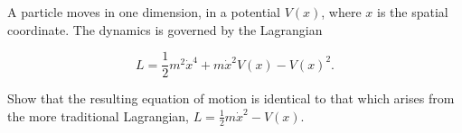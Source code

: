 \documentclass[../main.tex]{subfiles}
\begin{document}
\begin{problema}
	A particle moves in one dimension, in a potential \(V(x)\), where \(x\)
	is the spatial coordinate. The dynamics is governed by the Lagrangian

	\begin{equation*}
		L = \dfrac{1}{2}m^{2}\dot{x}^{4} + m \dot{x}^{2}V(x) - V(x)^{2}.
	\end{equation*}

	Show that the resulting equation of motion is identical to that which
	arises from the more traditional Lagrangian, \(L = \tfrac{1}{2}m \dot{x}^{2} - V(x)\).
\end{problema}
\end{document}
